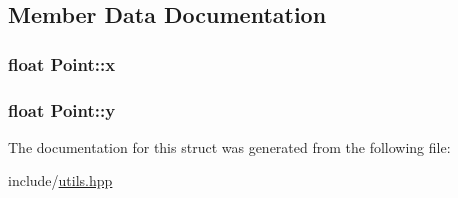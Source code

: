 \subsection{Member Data Documentation}
\subsubsection[{\texorpdfstring{x}{x}}]{\setlength{\rightskip}{0pt plus 5cm}float Point\+::x}\hypertarget{structPoint_a05dfe2dfbde813ad234b514f30e662f1}{}\label{structPoint_a05dfe2dfbde813ad234b514f30e662f1}
\subsubsection[{\texorpdfstring{y}{y}}]{\setlength{\rightskip}{0pt plus 5cm}float Point\+::y}\hypertarget{structPoint_a6101960c8d2d4e8ea1d32c9234bbeb8d}{}\label{structPoint_a6101960c8d2d4e8ea1d32c9234bbeb8d}


The documentation for this struct was generated from the following file\+:\begin{DoxyCompactItemize}
\item 
include/\hyperlink{utils_8hpp}{utils.\+hpp}\end{DoxyCompactItemize}
